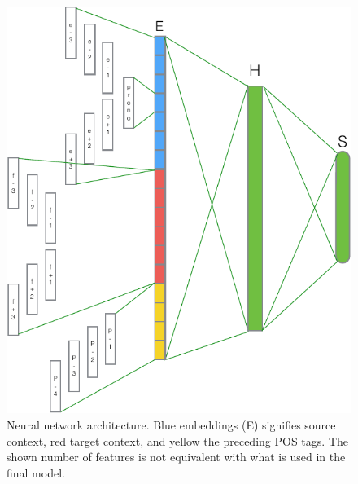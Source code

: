 \documentclass[11pt]{article}
\begin{document}
\begin{figure}[htbp]
    \centering
    \includegraphics[width=\columnwidth]{figures/nnarchitecture.pdf}
    \caption{Neural network architecture. Blue embeddings (E) signifies source context, red target context, and yellow the preceding POS tags. The shown number of features is not equivalent with what is used in the final model.}
    \label{fig:nnarchitecture}
\end{figure}
\end{document}
